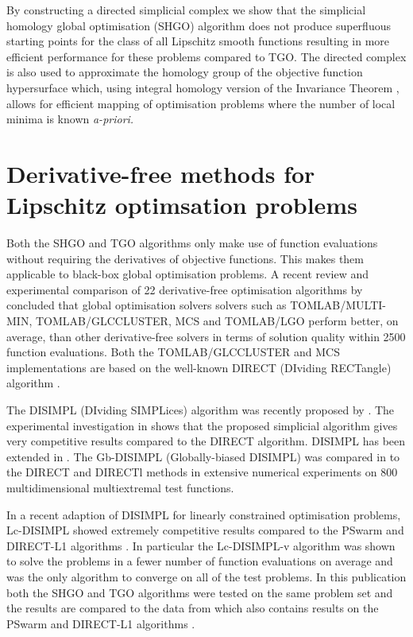 By constructing a directed simplicial complex we show that the simplicial homology global optimisation (SHGO) algorithm does not produce superfluous starting points for the class of all Lipschitz smooth functions resulting in more efficient performance for these problems compared to TGO. The directed complex is also used to approximate the homology group of the objective function hypersurface which, using integral homology version of the Invariance Theorem \cite{Henle1979}, allows for efficient mapping of optimisation problems where the number of local minima is known \it{a-priori}\normalfont. %

\section{Derivative-free methods for Lipschitz optimsation problems}
Both the SHGO and TGO algorithms only make use of function evaluations without requiring the derivatives of objective functions. This makes them applicable to black-box global optimisation problems. A recent review and experimental comparison of 22 derivative-free optimisation algorithms by \citet{Rios2013} concluded that global optimisation solvers solvers such as TOMLAB/MULTI-MIN, TOMLAB/GLCCLUSTER, MCS and TOMLAB/LGO perform better, on average, than other derivative-free solvers in terms of solution quality within 2500 function evaluations. Both the TOMLAB/GLCCLUSTER and MCS \cite{Huyer1999} implementations are based on the well-known DIRECT (DIviding RECTangle) algorithm \cite{Jones1993}.
 
The DISIMPL (DIviding SIMPLices) algorithm was recently proposed by \citet{Paul2014b}. The experimental investigation in \cite{Paul2014b} shows that the proposed simplicial algorithm gives very competitive results compared to the DIRECT algorithm. DISIMPL has been extended in \cite{paulavivcius2014simplicial, Paul2014a}. The Gb-DISIMPL (Globally-biased DISIMPL) was compared in \cite{Paul2014a} to the DIRECT and DIRECTl methods in extensive numerical experiments on 800 multidimensional multiextremal test functions.

In a recent adaption of DISIMPL for linearly constrained optimisation problems, Lc-DISIMPL \cite{Paul2016} showed extremely competitive results compared to the PSwarm \cite{Vaz2008} and DIRECT-L1 algorithms \cite{finkel2003direct}. In particular the Lc-DISIMPL-v algorithm was shown to solve the problems in a fewer number of function evaluations on average and was the only algorithm to converge on all of the test problems. In this publication both the SHGO and TGO algorithms were tested on the same problem set and the results are compared to the data from \cite{Paul2016} which also contains results on the PSwarm \cite{Vaz2008} and DIRECT-L1 algorithms \cite{finkel2003direct}.

